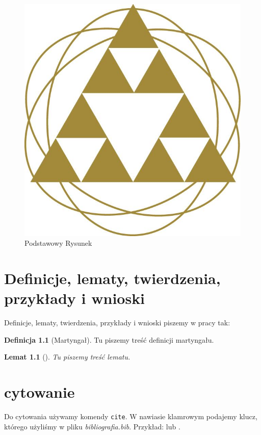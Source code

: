 \documentclass[inzynierska]{pwr_wmat_praca_dyplomowa}
\theoremstyle{plain}
\numberwithin{theorem}{chapter}
\newtheorem{lemma}[theorem]{Lemat}
\theoremstyle{definition}
\numberwithin{theorem}{chapter}
\newtheorem{definition}[theorem]{Definicja}
\begin{document}
\begin{figure}[ht]
	
	\centering
	
	\includegraphics[scale=0.27]{logo_w13.jpg}
	\caption{Podstawowy Rysunek}\label{rys1}
\end{figure}
\label{rys:przykladowy} 


\chapter{Definicje, lematy, twierdzenia, przykłady i wnioski}
Definicje, lematy, twierdzenia, przykłady i wnioski piszemy w pracy tak:
\begin{definition}[Martyngał]
	Tu piszemy treść definicji martyngału.
\end{definition}
\begin{lemma}[]%
	Tu piszemy treść lematu.
\end{lemma}
\chapter{cytowanie}
Do cytowania używamy komendy \texttt{cite}. W nawiasie klamrowym podajemy klucz, którego użyliśmy w pliku \emph{bibliografia.bib}. Przykład: \cite{einstein} lub \cite[chap. 2]{latexcompanion}.
\end{document}
